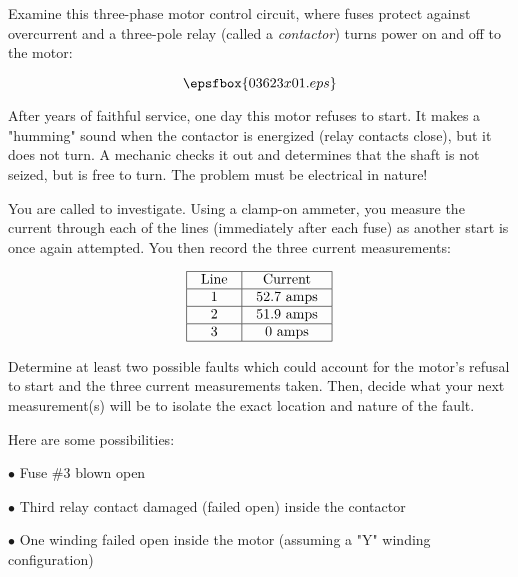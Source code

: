 

Examine this three-phase motor control circuit, where fuses protect against overcurrent and a three-pole relay (called a {\it contactor}) turns power on and off to the motor:

$$\epsfbox{03623x01.eps}$$

After years of faithful service, one day this motor refuses to start.  It makes a "humming" sound when the contactor is energized (relay contacts close), but it does not turn.  A mechanic checks it out and determines that the shaft is not seized, but is free to turn.  The problem must be electrical in nature!

You are called to investigate.  Using a clamp-on ammeter, you measure the current through each of the lines (immediately after each fuse) as another start is once again attempted.  You then record the three current measurements:


$$\vbox{\offinterlineskip
\halign{\strut
\vrule \quad\hfil # \ \hfil & 
\vrule \quad\hfil # \ \hfil \vrule \cr
\noalign{\hrule}
%
Line & Current \cr
%
\noalign{\hrule}
%
1 & 52.7 amps \cr
%
\noalign{\hrule}
%
2 & 51.9 amps \cr
%
\noalign{\hrule}
%
3 & 0 amps \cr
%
\noalign{\hrule}
} %
}$$ %

Determine at least two possible faults which could account for the motor's refusal to start and the three current measurements taken.  Then, decide what your next measurement(s) will be to isolate the exact location and nature of the fault.







Here are some possibilities:

\medskip
\item{$\bullet$} Fuse \#3 blown open
\item{$\bullet$} Third relay contact damaged (failed open) inside the contactor
\item{$\bullet$} One winding failed open inside the motor (assuming a "Y" winding configuration)
\medskip

